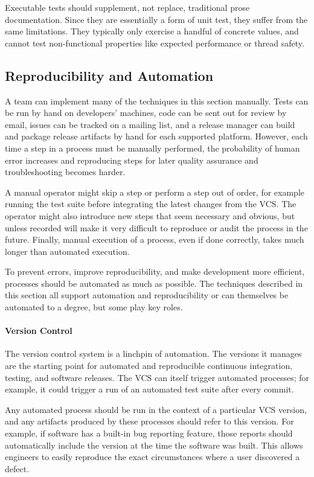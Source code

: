 Executable tests should supplement, not replace, traditional prose
documentation. Since they are essentially a form of unit test, they
suffer from the same limitations. They typically only exercise a
handful of concrete values, and cannot test non-functional properties
like expected performance or thread safety.

\subsection{Reproducibility and Automation}

A team can implement many of the techniques in this section
manually. Tests can be run by hand on developers' machines, code can
be sent out for review by email, issues can be tracked on a mailing
list, and a release manager can build and package release artifacts by
hand for each supported platform. However, each time a step in a
process must be manually performed, the probability of human error
increases and reproducing steps for later quality assurance and
troubleshooting becomes harder.

A manual operator might skip a step or perform a step out of order,
for example running the test suite before integrating the latest
changes from the VCS. The operator might also introduce new steps that
seem necessary and obvious, but unless recorded will make it very
difficult to reproduce or audit the process in the future. Finally,
manual execution of a process, even if done correctly, takes much
longer than automated execution.

To prevent errors, improve reproducibility, and make development more
efficient, processes should be automated as much as possible. The
techniques described in this section all support automation and
reproducibility or can themselves be automated to a degree, but some
play key roles.

\paragraph{Version Control}

The version control system is a linchpin of automation. The versions
it manages are the starting point for automated and reproducible
continuous integration, testing, and software releases. The VCS can
itself trigger automated processes; for example, it could trigger a
run of an automated test suite after every commit.

Any automated process should be run in the context of a particular VCS
version, and any artifacts produced by these processes should refer to
this version. For example, if software has a built-in bug reporting
feature, those reports should automatically include the version at the
time the software was built. This allows engineers to easily reproduce
the exact circumstances where a user discovered a defect.

